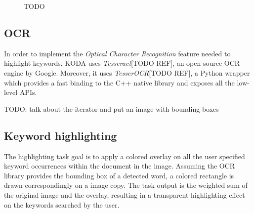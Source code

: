 \documentclass[a4paper]{article}
\begin{document}
\begin{figure}[H]
	\caption{TODO}
	\label{fig:warping}
\end{figure}

\subsection{OCR}

In order to implement the \textit{Optical Character Recognition} feature needed to highlight keywords, KODA uses \textit{Tesseract}[TODO REF], an open-source OCR engine by Google. Moreover, it uses \textit{TesserOCR}[TODO REF], a Python wrapper which provides a fast binding to the C++ native library and exposes all the low-level APIs.

TODO: talk about the iterator and put an image with bounding boxes

\subsection{Keyword highlighting}

The highlighting task goal is to apply a colored overlay on all the user specified keyword occurrences within the document in the image. Assuming the OCR library provides the bounding box of a detected word, a colored rectangle is drawn correspondingly on a image copy. The task output is the weighted sum of the original image and the overlay, resulting in a transparent highlighting effect on the keywords searched by the user. 
\end{document}

